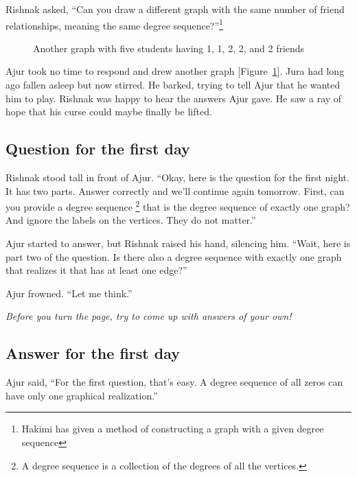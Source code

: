 Rishnak asked, ``Can you draw a different graph with the same number of friend relationships, meaning the same degree sequence?''\footnote{Hakimi has given a method of constructing a graph with a given degree sequence}

\begin{figure}
\begin{center}
\caption{Another graph with five students having 1, 1, 2, 2, and 2 friends}\label{dg4}
\end{center}
\end{figure}

Ajur took no time to respond and drew another graph [Figure~\ref{dg4}].
Jura had long ago fallen asleep but now stirred. He barked, trying to tell Ajur that he wanted him to play. Rishnak was happy to hear the answers Ajur gave. He saw a ray of hope that his curse could maybe finally be lifted.

\subsection*{Question for the first day}
Rishnak stood tall in front of Ajur.  ``Okay, here is the question for the first night.  It has two parts.  Answer correctly and we'll continue again tomorrow. First, can you provide a degree sequence \footnote{A degree sequence is a collection of the degrees of all the vertices.} that is the degree sequence of exactly one graph? And ignore the labels on the vertices. They do not matter.''

Ajur started to answer, but Rishnak raised his hand, silencing him.  ``Wait, here is part two of the question. Is there also a degree sequence with exactly one graph that realizes it that has at least one edge?''

Ajur frowned.  ``Let me think.''

\textit{Before you turn the page, try to come up with answers of your own!}

\newpage
\subsection*{Answer for the first day}
Ajur said, ``For the first question, that's easy.  A degree sequence of all zeros can have only one graphical realization.''

